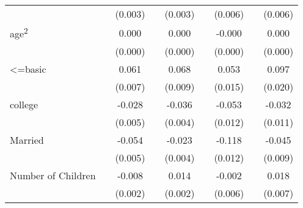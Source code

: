 \begin{sidewaystable}
\begin{tabular}{l*{2}{c}| *{2}{c}| *{2}{c}| *{2}{c}}
&                     &     (0.003)         &                     &     (0.003)         &                     &     (0.006)         &                     &     (0.006)         \\
age\textsuperscript{2}   &                     &       0.000         &                     &       0.000\sym{***}&                     &      -0.000         &                     &       0.000         \\
&                     &     (0.000)         &                     &     (0.000)         &                     &     (0.000)         &                     &     (0.000)         \\
<=basic             &                     &       0.061\sym{***}&                     &       0.068\sym{***}&                     &       0.053\sym{***}&                     &       0.097\sym{***}\\
&                     &     (0.007)         &                     &     (0.009)         &                     &     (0.015)         &                     &     (0.020)         \\
college             &                     &      -0.028\sym{***}&                     &      -0.036\sym{***}&                     &      -0.053\sym{***}&                     &      -0.032\sym{***}\\
&                     &     (0.005)         &                     &     (0.004)         &                     &     (0.012)         &                     &     (0.011)         \\
Married             &                     &      -0.054\sym{***}&                     &      -0.023\sym{***}&                     &      -0.118\sym{***}&                     &      -0.045\sym{***}\\
&                     &     (0.005)         &                     &     (0.004)         &                     &     (0.012)         &                     &     (0.009)         \\
Number of Children  &                     &      -0.008\sym{***}&                     &       0.014\sym{***}&                     &      -0.002         &                     &       0.018\sym{***}\\
&                     &     (0.002)         &                     &     (0.002)         &                     &     (0.006)         &                     &     (0.007)         \\


\end{tabular}
\end{sidewaystable}
